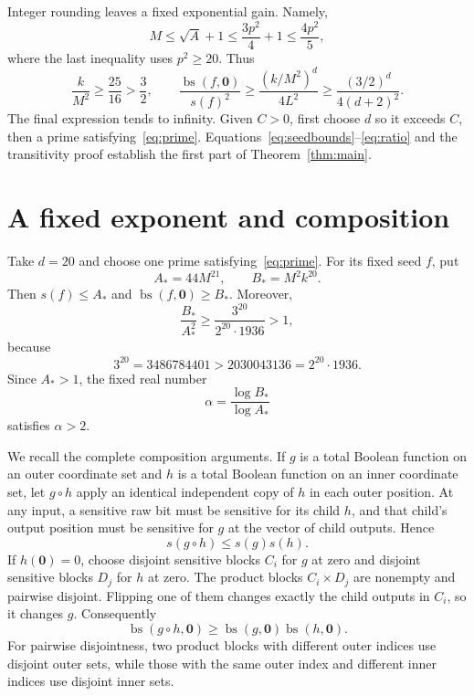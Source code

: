 \documentclass[11pt]{article}
\theoremstyle{definition}
\DeclareMathOperator{\bs}{bs}
\newcommand{\zero}{\mathbf 0}
\begin{document}
Integer rounding leaves a fixed exponential gain. Namely,
\[
 M\le\sqrt A+1\le\frac{3p^2}{4}+1\le\frac{4p^2}{5},
\]
where the last inequality uses $p^2\ge20$. Thus
\begin{equation}\label{eq:ratio}
 \frac{k}{M^2}\ge\frac{25}{16}>\frac32,
 \qquad
 \frac{\bs(f,\zero)}{s(f)^2}
 \ge\frac{(k/M^2)^d}{4L^2}
 \ge\frac{(3/2)^d}{4(d+2)^2}.
\end{equation}
The final expression tends to infinity. Given $C>0$, first choose $d$ so it exceeds $C$, then a prime satisfying~\eqref{eq:prime}. Equations~\eqref{eq:seedbounds}--\eqref{eq:ratio} and the transitivity proof establish the first part of Theorem~\ref{thm:main}.

\section{A fixed exponent and composition}\label{sec:composition}
Take $d=20$ and choose one prime satisfying~\eqref{eq:prime}. For its fixed seed $f$, put
\[
 A_*=44M^{21},\qquad B_*=M^2k^{20}.
\]
Then $s(f)\le A_*$ and $\bs(f,\zero)\ge B_*$. Moreover,
\[
 \frac{B_*}{A_*^2}\ge\frac{3^{20}}{2^{20}\cdot1936}>1,
\]
because
\[
 3^{20}=3486784401>2030043136=2^{20}\cdot1936.
\]
Since $A_*>1$, the fixed real number
\begin{equation}\label{eq:alpha}
 \alpha=\frac{\log B_*}{\log A_*}
\end{equation}
satisfies $\alpha>2$.

We recall the complete composition arguments. If $g$ is a total Boolean function on an outer coordinate set and $h$ is a total Boolean function on an inner coordinate set, let $g\circ h$ apply an identical independent copy of $h$ in each outer position. At any input, a sensitive raw bit must be sensitive for its child $h$, and that child's output position must be sensitive for $g$ at the vector of child outputs. Hence
\begin{equation}\label{eq:compose-s}
 s(g\circ h)\le s(g)s(h).
\end{equation}
If $h(\zero)=0$, choose disjoint sensitive blocks $C_i$ for $g$ at zero and disjoint sensitive blocks $D_j$ for $h$ at zero. The product blocks $C_i\times D_j$ are nonempty and pairwise disjoint. Flipping one of them changes exactly the child outputs in $C_i$, so it changes $g$. Consequently
\begin{equation}\label{eq:compose-bs}
 \bs(g\circ h,\zero)\ge\bs(g,\zero)\bs(h,\zero).
\end{equation}
For pairwise disjointness, two product blocks with different outer indices use disjoint outer sets, while those with the same outer index and different inner indices use disjoint inner sets.
\end{document}

